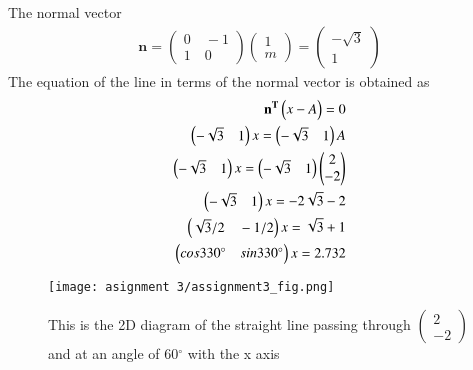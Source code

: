 \documentclass[journal,12pt,twocolumn]{IEEEtran}
\newcommand{\myvec}[1]{\ensuremath{\begin{pmatrix}#1\end{pmatrix}}}
\numberwithin{equation}{subsection}
\let\vec\mathbf
\begin{document}
The normal vector
\begin{align}
\vec{n}=\myvec{0 \quad -1\\1 \quad 0} \myvec{1 \\m} = \myvec{-\sqrt3\\ 1}
\end{align}
The equation of the line in terms of the normal vector is obtained as
\begin{align}
\vec{n^T}\myvec{x-A}  =0\\
\myvec{-\sqrt3\quad 1}x=\myvec{-\sqrt3\quad 1}A\\
\myvec{-\sqrt3\quad 1}x=\myvec{-\sqrt3\quad 1}\myvec{2 \\-2}\\
\myvec{-\sqrt3\quad 1}x=-2\sqrt{3}-2\\
\myvec{\sqrt3/2\quad -1/2}x=\sqrt{3}+1\\
\vspace{1cm}
\myvec{ cos 330^{\circ} \quad sin 330^{\circ}}x= 2.732
\end{align}

\begin{figure}[!]
 \begin{center}
  \texttt{[image: asignment 3/assignment3\_fig.png]}
    \caption{This is the 2D diagram of the straight line passing through $\myvec{2 \\-2}$ and at an angle of 60$^{\circ}$ with the x axis }
    \label{myfig:1}
    \end{center}
\end{figure}
\end{document}
